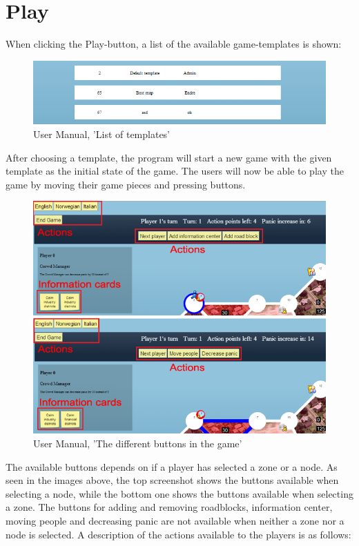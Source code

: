 \section{Play}

When clicking the Play-button, a list of the available game-templates is shown:

\begin{figure}[H]
  \centering
    \includegraphics[width=1.0\textwidth]{img/gamelist.png}
  \caption{User Manual, 'List of templates'}
  \label{fig:gamelist}
\end{figure}

\noindent After choosing a template, the program will start a new game with the given template as the initial state of the game. The users will now be able to play the game by moving their game pieces and pressing buttons.

\begin{figure}[H]
  \centering
    \includegraphics[width=1.0\textwidth]{img/buttonsbothredtext.png}
  \caption{User Manual, 'The different buttons in the game'}
  \label{fig:buttons}
\end{figure}

\noindent The available buttons depends on if a player has selected a zone or a node. As seen in the images above, the top screenshot shows the buttons available when selecting a node, while the bottom one shows the buttons available when selecting a zone. The buttons for adding and removing roadblocks, information center, moving people and decreasing panic are not available when neither a zone nor a node is selected. A description of the actions available to the players is as follows:


